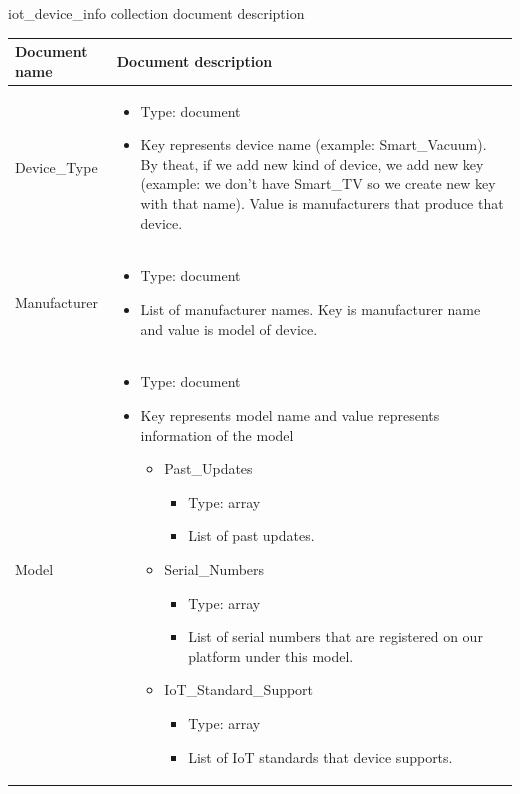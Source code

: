 iot{\_}device{\_}info collection document description
\begin{center}
\begin{longtable}{ |m{4cm}|m{9cm}| } 
 \hline
 Document name & Document description \\ 
 \hline
  Device{\_}Type &   
  \begin{itemize}
    \item Type: document
    \item Key represents device name (example: Smart{\_}Vacuum). By theat, if we add new kind of device, we add new key (example: we don't have Smart{\_}TV so we create new key with that name). Value is manufacturers that produce that device.
  \end{itemize} \\
  \hline
  Manufacturer &  
  \begin{itemize}
    \item Type: document
    \item List of manufacturer names. Key is manufacturer name and value is model of device.
  \end{itemize} \\
  \hline
  Model &  
  \begin{itemize}
    \item Type: document
    \item Key represents model name and value represents information of the model
    \begin{itemize}
        \item Past{\_}Updates
        \begin{itemize}
            \item Type: array
            \item List of past updates.
        \end{itemize}
        
        \item Serial{\_}Numbers
        \begin{itemize}
            \item Type: array
            \item List of serial numbers that are registered on our platform under this model.
        \end{itemize}
        
        \item IoT{\_}Standard{\_}Support
        \begin{itemize}
            \item Type: array
            \item List of IoT standards that device supports.
        \end{itemize}
        

\end{itemize}
\end{itemize}
\end{longtable}
\end{center}
